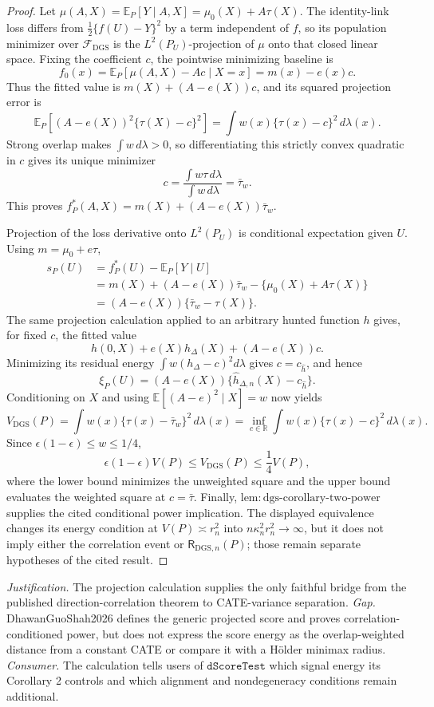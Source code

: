 \documentclass{article}
\begin{document}
\begin{proof}
Let \(\mu(A,X)=\mathbb E_P[Y\mid A,X]=\mu_0(X)+A\tau(X)\).  The identity-link loss differs from \(\frac12\{f(U)-Y\}^2\) by a term independent of \(f\), so its population minimizer over \(\mathcal F_{\mathrm{DGS}}\) is the \(L^2(P_U)\)-projection of \(\mu\) onto that closed linear space.  Fixing the coefficient \(c\), the pointwise minimizing baseline is
\[
 f_0(x)=\mathbb E_P[\mu(A,X)-Ac\mid X=x]
       =m(x)-e(x)c.
\]
Thus the fitted value is \(m(X)+(A-e(X))c\), and its squared projection error is
\[
 \mathbb E_P[(A-e(X))^2\{\tau(X)-c\}^2]
 =\int w(x)\{\tau(x)-c\}^2\,d\lambda(x).
\]
Strong overlap makes \(\int w\,d\lambda>0\), so differentiating this strictly convex quadratic in \(c\) gives its unique minimizer
\[
 c=\frac{\int w\tau\,d\lambda}{\int w\,d\lambda}=\bar\tau_w.
\]
This proves \(f_P^*(A,X)=m(X)+(A-e(X))\bar\tau_w\).

Projection of the loss derivative onto \(L^2(P_U)\) is conditional expectation given \(U\).  Using \(m=\mu_0+e\tau\),
\[
\begin{aligned}
 s_P(U)
 &=f_P^*(U)-\mathbb E_P[Y\mid U]\\
 &=m(X)+(A-e(X))\bar\tau_w-\{\mu_0(X)+A\tau(X)\}\\
 &=(A-e(X))\{\bar\tau_w-\tau(X)\}.
\end{aligned}
\]
The same projection calculation applied to an arbitrary hunted function \(h\) gives, for fixed \(c\), the fitted value
\[
 h(0,X)+e(X)h_\Delta(X)+(A-e(X))c.
\]
Minimizing its residual energy \(\int w(h_\Delta-c)^2d\lambda\) gives \(c=c_{\widehat h}\), and hence
\[
 \xi_P(U)=(A-e(X))\{\widehat h_{\Delta,n}(X)-c_{\widehat h}\}.
\]
Conditioning on \(X\) and using \(\mathbb E[(A-e)^2\mid X]=w\) now yields
\[
 V_{\mathrm{DGS}}(P)
 =\int w(x)\{\tau(x)-\bar\tau_w\}^2\,d\lambda(x)
 =\inf_{c\in\mathbb R}\int w(x)\{\tau(x)-c\}^2\,d\lambda(x).
\]
Since \(\epsilon(1-\epsilon)\le w\le1/4\),
\[
 \epsilon(1-\epsilon)V(P)
 \le V_{\mathrm{DGS}}(P)
 \le \frac14V(P),
\]
where the lower bound minimizes the unweighted square and the upper bound evaluates the weighted square at \(c=\bar\tau\).  Finally, \(\mathrm{lem:dgs\mbox{-}corollary\mbox{-}two\mbox{-}power}\) supplies the cited conditional power implication.  The displayed equivalence changes its energy condition at \(V(P)\asymp r_n^2\) into \(n\kappa_n^2r_n^2\to\infty\), but it does not imply either the correlation event or \(\mathsf R_{\mathrm{DGS},n}(P)\); those remain separate hypotheses of the cited result.
\end{proof}
\par\smallskip\noindent \textit{Justification.} The projection calculation supplies the only faithful bridge from the published direction-correlation theorem to CATE-variance separation. \textit{Gap.} DhawanGuoShah2026 defines the generic projected score and proves correlation-conditioned power, but does not express the score energy as the overlap-weighted distance from a constant CATE or compare it with a Hölder minimax radius. \textit{Consumer.} The calculation tells users of \(\texttt{dScoreTest}\) which signal energy its Corollary 2 controls and which alignment and nondegeneracy conditions remain additional.
\end{document}
